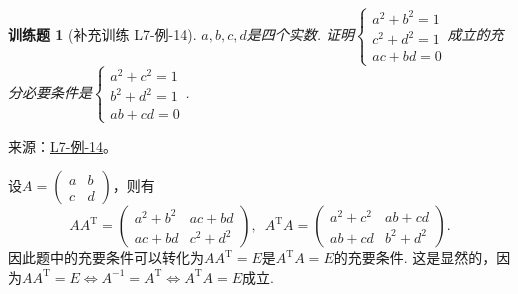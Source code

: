 \documentclass[12pt,fontset=fandol]{ctexart}
\newtheorem{exercise}{训练题}[section]
\begin{document}
\begin{exercise}[补充训练 L7-例-14]\label{prob:L7-例-14}
$a,b,c,d$是四个实数. 证明$\begin{cases}
            a^2+b^2=1 \\
            c^2+d^2=1 \\
            ac+bd=0
        \end{cases}$成立的充分必要条件是$\begin{cases}
            a^2+c^2=1 \\
            b^2+d^2=1 \\
            ab+cd=0
        \end{cases}$.
\end{exercise}
\noindent 来源：\href{https://github.com/yhwu-is/Linear-Algebra-Left-Undone/blob/new/%E8%AE%B2%E4%B9%89/%E4%B8%93%E9%A2%98/7%20%E7%BA%BF%E6%80%A7%E6%98%A0%E5%B0%84%E7%9F%A9%E9%98%B5%E8%A1%A8%E7%A4%BA%E4%B8%8E%E7%9F%A9%E9%98%B5%E8%BF%90%E7%AE%97%E5%9F%BA%E7%A1%80.tex}{L7-例-14}。
\begin{solve}
设$A=\begin{pmatrix}
            a & b \\ c & d
        \end{pmatrix}$，则有
    \[AA^\mathrm{T}=\begin{pmatrix}
            a^2+b^2 & ac+bd \\ ac+bd & c^2+d^2
        \end{pmatrix},\enspace A^\mathrm{T}A=\begin{pmatrix}
            a^2+c^2 & ab+cd \\ ab+cd & b^2+d^2
        \end{pmatrix}.\]
    因此题中的充要条件可以转化为$AA^\mathrm{T}=E$是$A^\mathrm{T}A=E$的充要条件. 这是显然的，因为$AA^\mathrm{T}=E\iff A^{-1}=A^\mathrm{T}\iff A^\mathrm{T}A=E$成立.
\end{solve}
\end{document}
